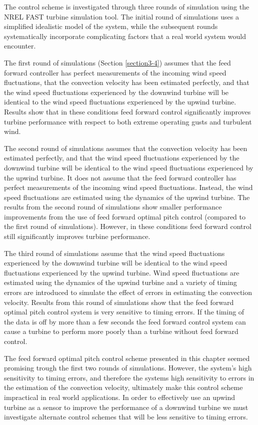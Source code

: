 The control scheme is investigated through three rounds of simulation using the NREL FAST turbine simulation tool. The initial round of simulations uses a simplified idealistic model of the system, while the subsequent rounds systematically incorporate complicating factors that a real world system would encounter.  

The first round of simulations (Section \ref{section3-4}) assumes that the feed forward controller has perfect measurements of the incoming wind speed fluctuations, that the convection velocity has been estimated perfectly, and that the wind speed fluctuations experienced by the downwind turbine will be identical to the wind speed fluctuations experienced by the upwind turbine. Results show that in these conditions feed forward control significantly improves turbine performance with respect to both extreme operating gusts and turbulent wind.

The second round of simulations assumes that the convection velocity has been estimated perfectly, and that the wind speed fluctuations experienced by the downwind turbine will be identical to the wind speed fluctuations experienced by the upwind turbine. It does not assume that the feed forward controller has perfect measurements of the incoming wind speed fluctuations. Instead, the wind speed fluctuations are estimated using the dynamics of the upwind turbine. The results from the second round of simulations show smaller performance improvements from the use of feed forward optimal pitch control (compared to the first round of simulations). However, in these conditions feed forward control still significantly improves turbine performance.

The third round of simulations assume that the wind speed fluctuations experienced by the downwind turbine will be identical to the wind speed fluctuations experienced by the upwind turbine. Wind speed fluctuations are estimated using the dynamics of the upwind turbine and a variety of timing errors are introduced to simulate the effect of errors in estimating the convection velocity. Results from this round of simulations show that the feed forward optimal pitch control system is very sensitive to timing errors. If the timing of the data is off by more than a few seconds the feed forward control system can cause a turbine to perform more poorly than a turbine without feed forward control.

The feed forward optimal pitch control scheme presented in this chapter seemed promising trough the first two rounds of simulations. However, the system's high sensitivity to timing errors, and therefore the systems high sensitivity to errors in the estimation of the convection velocity, ultimately make this control scheme impractical in real world applications. In order to effectively use an upwind turbine as a sensor to improve the performance of a downwind turbine we must investigate alternate control schemes that will be less sensitive to timing errors.
